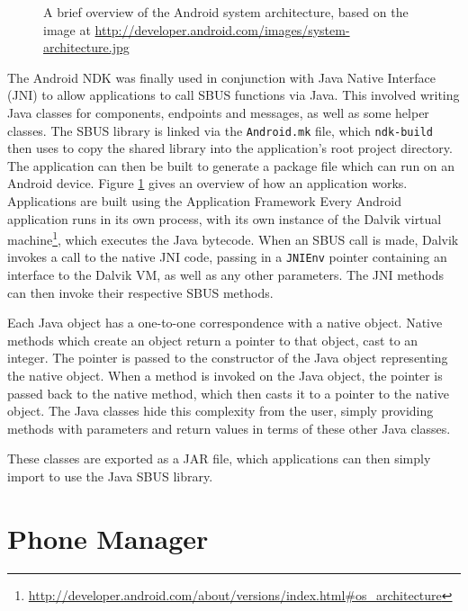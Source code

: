 \documentclass[12pt,twoside,notitlepage]{report}
\begin{document}

\begin{figure}[tbh]
\epsfxsize=8cm
\centerline{}
\caption[Android System Architecture]{A brief overview of the Android system architecture, based on the image at \url{http://developer.android.com/images/system-architecture.jpg}}
\label{fig:android_stack}
\end{figure}

The Android NDK was finally used in conjunction with Java Native Interface (JNI) to allow applications to call SBUS functions via Java. 
This involved writing Java classes for components, endpoints and messages, as well as some helper classes. 
The SBUS library is linked via the {\tt Android.mk} file, which {\tt ndk-build} then uses to copy the shared library into the application's root project directory. 
The application can then be built to generate a package file which can run on an Android device. 
Figure \ref{fig:android_stack} gives an overview of how an application works. 
Applications are built using the Application Framework
Every Android application runs in its own process, with its own instance of the Dalvik virtual machine\footnote{\url{http://developer.android.com/about/versions/index.html\#os_architecture}}, which executes the Java bytecode. 
When an SBUS call is made, Dalvik invokes a call to the native JNI code, passing in a {\tt JNIEnv} pointer containing an interface to the Dalvik VM, as well as any other parameters. 
The JNI methods can then invoke their respective SBUS methods. 


Each Java object has a one-to-one correspondence with a native object. 
Native methods which create an object return a pointer to that object, cast to an integer. 
The pointer is passed to the constructor of the Java object representing the native object.
When a method is invoked on the Java object, the pointer is passed back to the native method, which then casts it to a pointer to the native object.
The Java classes hide this complexity from the user, simply providing methods with parameters and return values in terms of these other Java classes.

These classes are exported as a JAR file, which applications can then simply import to use the Java SBUS library.

\section{Phone Manager}
\end{document}
